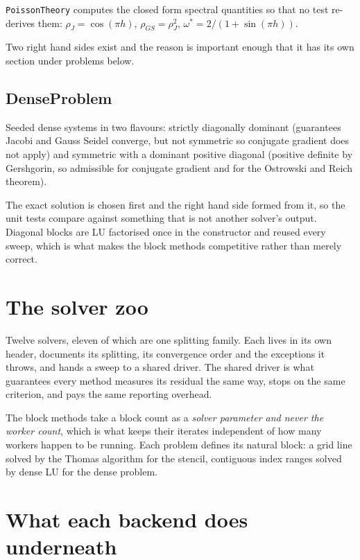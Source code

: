 \documentclass[11pt,a4paper]{report}
\begin{document}
\texttt{PoissonTheory} computes the closed form spectral quantities so that no
test re-derives them: $\rho_J = \cos(\pi h)$,
$\rho_{GS} = \rho_J^2$, $\omega^{*} = 2/(1 + \sin(\pi h))$.

Two right hand sides exist and the reason is important enough that it has its own
section under problems below.

\subsection{DenseProblem}

Seeded dense systems in two flavours: strictly diagonally dominant (guarantees
Jacobi and Gauss Seidel converge, but not symmetric so conjugate gradient does
not apply) and symmetric with a dominant positive diagonal (positive definite by
Gershgorin, so admissible for conjugate gradient and for the Ostrowski and Reich
theorem).

The exact solution is chosen first and the right hand side formed from it, so the
unit tests compare against something that is not another solver's output.
Diagonal blocks are LU factorised once in the constructor and reused every sweep,
which is what makes the block methods competitive rather than merely correct.

\section{The solver zoo}

Twelve solvers, eleven of which are one splitting family. Each lives in its own
header, documents its splitting, its convergence order and the exceptions it
throws, and hands a sweep to a shared driver. The shared driver is what
guarantees every method measures its residual the same way, stops on the same
criterion, and pays the same reporting overhead.

The block methods take a block count as a \emph{solver parameter and never the
worker count}, which is what keeps their iterates independent of how many workers
happen to be running. Each problem defines its natural block: a grid line solved
by the Thomas algorithm for the stencil, contiguous index ranges solved by dense
LU for the dense problem.

\section{What each backend does underneath}
\end{document}
